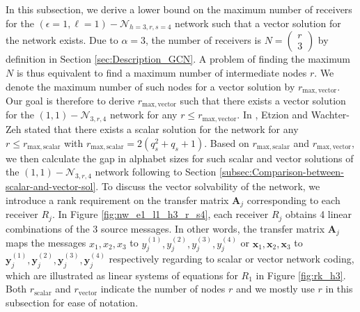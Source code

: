In this subsection, we derive a lower bound on the maximum number
of receivers for the $\left(\epsilon=1,\ell=1\right)-\mathcal{N}_{h=3,r,s=4}$
network such that a vector solution for the network exists. Due to
$\alpha=3$, the number of receivers is $N=\left(\begin{array}{c}
r\\
3
\end{array}\right)$ by definition in Section \ref{sec:Description_GCN}. A problem of
finding the maximum $N$ is thus equivalent to find a maximum number
of intermediate nodes $r$. We denote the maximum number of such nodes
for a vector solution by $r_{\mathrm{max,vector}}$. Our goal is therefore
to derive $r_{\mathrm{max,vector}}$ such that there exists a vector
solution for the $\left(1,1\right)-\mathcal{N}_{3,r,4}$ network for
any $r\leq r_{\mathrm{max,vector}}$. In \cite[Section VIII.C]{Wachter-Zeh:2018},
Etzion and Wachter-Zeh stated that there exists a scalar solution
for the network for any $r\leq r_{\mathrm{max,scalar}}$ with $r_{\mathrm{max,scalar}}=2\left(q_{s}^{2}+q_{s}+1\right)$.
Based on $r_{\mathrm{max,scalar}}$ and $r_{\mathrm{max,vector}}$,
we then calculate the gap in alphabet sizes for such scalar and vector
solutions of the $\left(1,1\right)-\mathcal{N}_{3,r,4}$ network following
to Section \ref{subsec:Comparison-between-scalar-and-vector-sol}.
To discuss the vector solvability of the network, we introduce a rank
requirement on the transfer matrix $\boldsymbol{A}_{j}$ corresponding
to each receiver $R_{j}$. In Figure \ref{fig:nw_e1_l1_h3_r_s4},
each receiver $R_{j}$ obtains 4 linear combinations of the 3 source
messages. In other words, the transfer matrix $\boldsymbol{A}_{j}$
maps the messages $x_{1},x_{2},x_{3}$ to $y_{j}^{\left(1\right)},y_{j}^{\left(2\right)},y_{j}^{\left(3\right)},y_{j}^{\left(4\right)}$
or $\boldsymbol{x}_{1},\boldsymbol{x}_{2},\boldsymbol{x}_{3}$ to
$\boldsymbol{y}_{j}^{\left(1\right)},\boldsymbol{y}_{j}^{\left(2\right)},\boldsymbol{y}_{j}^{\left(3\right)},\boldsymbol{y}_{j}^{\left(4\right)}$
respectively regarding to scalar or vector network coding, which are
illustrated as linear systems of equations for $R_{1}$ in Figure
\ref{fig:rk_h3}. Both $r_{\mathrm{scalar}}$ and $r_{\mathrm{vector}}$
indicate the number of nodes $r$ and we mostly use $r$ in this subsection
for ease of notation.


